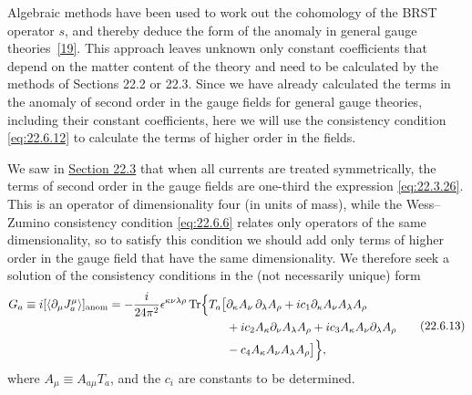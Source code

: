 Algebraic methods have been used to work out the cohomology of the BRST
operator $s$, and thereby deduce the form of the anomaly in general gauge
theories~\hyperref[ch22-ref-19]{[19]}. This approach leaves unknown only
constant coefficients that depend on the matter content of the theory and
need to be calculated by the methods of Sections 22.2 or 22.3. Since we
have already calculated the terms in the anomaly of second order in the
gauge fields for general gauge theories, including their constant
coefficients, here we will use the
consistency condition \eqref{eq:22.6.12} to calculate the terms of higher
order in the fields.

We saw in \hyperref[sec:22.3]{Section 22.3} that when all currents are
treated symmetrically, the terms of second order in the gauge fields are
one-third the expression \eqref{eq:22.3.26}. This is an operator of
dimensionality four (in units of mass), while the Wess--Zumino consistency
condition \eqref{eq:22.6.6} relates only operators of the same
dimensionality, so to satisfy this condition we should add only terms of
higher order in the gauge field that have the same dimensionality. We
therefore seek a solution of the consistency conditions in the (not
necessarily unique) form
\begin{equation}
 \begin{aligned}
 G_a
 \equiv i[\langle\partial_\mu J^\mu_a\rangle]_{\rm anom}
 =-\frac{i}{24\pi^2}\epsilon^{\kappa\nu\lambda\rho}
 \operatorname{Tr}\Bigl\{T_a\bigl[
 &\partial_\kappa A_\nu\,\partial_\lambda A_\rho
 +ic_1\partial_\kappa A_\nu A_\lambda A_\rho
 \\
 &+ic_2A_\kappa\partial_\nu A_\lambda A_\rho
 +ic_3A_\kappa A_\nu\partial_\lambda A_\rho
 \\
 &-c_4A_\kappa A_\nu A_\lambda A_\rho
 \bigr]\Bigr\},
 \end{aligned}
 \tag{22.6.13}\label{eq:22.6.13}
\end{equation}
where $A_\mu\equiv A_{a\mu}T_a$, and the $c_i$ are constants to
be determined.

